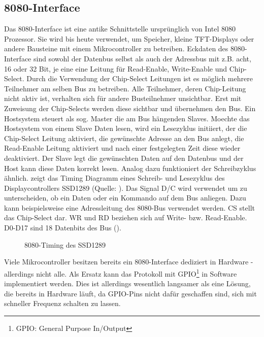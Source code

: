 \subsection{8080-Interface}
Das 8080-Interface ist eine antike Schnittstelle ursprünglich von Intel 8080 Prozessor. Sie wird bis heute verwendet, um Speicher, kleine TFT-Displays oder andere Bausteine mit einem Mikrocontroller zu betreiben. Eckdaten des 8080-Interface sind sowohl der Datenbus selbst als auch der Adressbus mit z.B. acht, 16 oder 32 Bit, je eine eine Leitung für Read-Enable, Write-Enable und Chip-Select. Durch die Verwendung der Chip-Select Leitungen ist es möglich mehrere Teilnehmer am selben Bus zu betreiben. Alle Teilnehmer, deren Chip-Leitung nicht aktiv ist, verhalten sich für andere Busteilnehmer unsichtbar. Erst mit Zuweisung der Chip-Selects werden diese sichtbar und übernehmen den Bus. Ein Hostsystem steuert als sog. Master die am Bus hängenden Slaves. Moechte das Hostsystem von einem Slave Daten lesen, wird ein Lesezyklus initiiert, der die Chip-Select Leitung aktiviert, die gewünschte Adresse an den Bus anlegt, die Read-Enable Leitung aktiviert und nach einer festgelegten Zeit diese wieder deaktiviert. Der Slave legt die gewünschten Daten auf den Datenbus und der Host kann diese Daten korrekt lesen. Analog dazu funktioniert der Schreibzyklus ähnlich. 
 zeigt das Timing Diagramm eines Schreib- und Lesezyklus des Displaycontrollers SSD1289 (Quelle: \cite{SSD2007}). Das Signal D/C wird verwendet um zu unterscheiden, ob ein Daten oder ein Kommando auf dem Bus anliegen. Dazu kann beispielsweise eine Adressleitung des 8080-Bus verwendet werden. CS stellt das Chip-Select dar. WR und RD beziehen sich auf Write- bzw. Read-Enable. D0-D17 sind 18 Datenbits des Bus (\cite{SSD2007}). 

\begin{figure}[htp]
	\centering
{}
	\caption{8080-Timing des SSD1289}
	\label{fig:8080_timing}
\end{figure}


Viele Mikrocontroller besitzen bereits ein 8080-Interface dediziert in Hardware - allerdings nicht alle. Als Ersatz kann das Protokoll mit GPIO\footnote{GPIO: General Purpose In/Output} in Software implementiert werden. Dies ist allerdings wesentlich langsamer als eine Lösung, die bereits in Hardware läuft, da GPIO-Pins nicht dafür geschaffen sind, sich mit schneller Frequenz schalten zu lassen.
\clearpage


